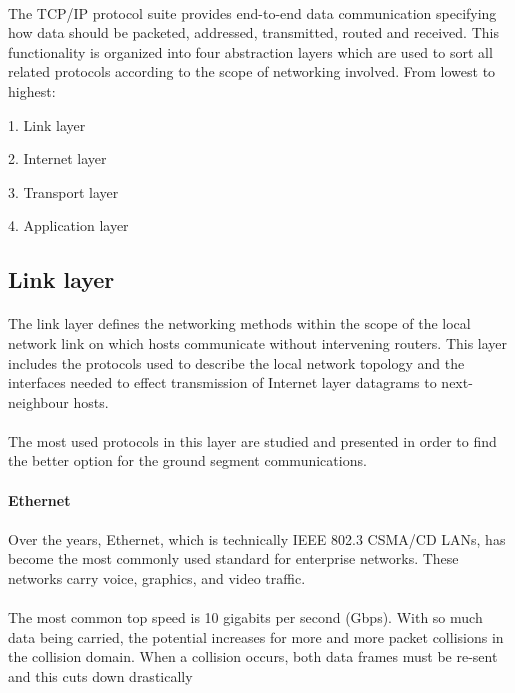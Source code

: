 \paragraph{}
The TCP/IP protocol suite provides end-to-end data communication specifying how data should be packeted, addressed, transmitted, routed and received. This functionality is organized into four abstraction layers which are used to sort all related protocols according to the scope of networking involved. From lowest to highest:
\begin{list}{}{}
\item 1. Link layer
\item 2. Internet layer
\item 3. Transport layer
\item 4. Application layer
\end{list}

\subsection{Link layer}
\paragraph{}
The link layer defines the networking methods within the scope of the local network link on which hosts communicate without intervening routers. This layer includes the protocols used to describe the local network topology and the interfaces needed to effect transmission of Internet layer datagrams to next-neighbour hosts. 
\paragraph{}
The most used protocols in this layer are studied and presented in order to find the better option for the ground segment communications.
\paragraph{}
\textbf{Ethernet}
\paragraph{}
Over the years, Ethernet, which is technically IEEE 802.3 CSMA/CD LANs, has become the most commonly used standard for enterprise networks. These networks carry voice, graphics, and video traffic.
\paragraph{}
The most common top speed is 10 gigabits per second (Gbps). With so much data being carried, the potential increases for more and more packet collisions in the collision domain. When a collision occurs, both data frames must be re-sent and this cuts down drastically 
